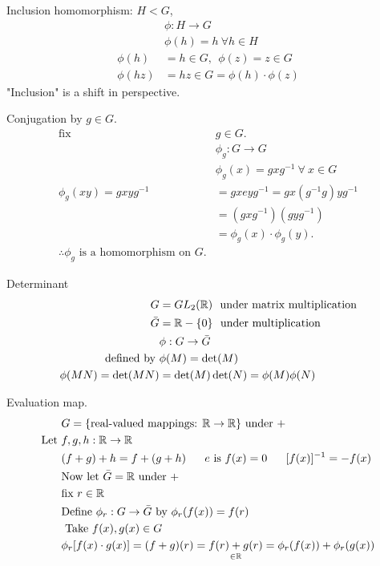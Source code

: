 \begin{example}
Inclusion homomorphism: $H<G$,
\begin{align}
    &\phi : H\rightarrow G \nonumber \\
    &\phi(h)= h \nonumber \ \forall h \in H \\
    \phi(h)&=h\in G, \ \ \phi(z)=z\in G \nonumber \\
    \phi(hz)&=hz\in G = \phi(h)\cdot \phi(z) \nonumber
\end{align}
"Inclusion" is a shift in perspective.
\end{example}

\begin{example}
Conjugation by $g\in G$.
\begin{align}
    \text{fix } &g \in G. \nonumber \\
    &\phi_g: G\rightarrow G \nonumber \\
    &\phi_g(x)=gxg^{-1} \ \forall \ x \in G \nonumber \\
    \phi_g(xy)=gxyg^{-1}&=gxeyg^{-1}=gx(g^{-1}g)yg^{-1} \nonumber \\
    &=(gxg^{-1})(gyg^{-1}) \nonumber \\
    &=\phi_g(x)\cdot \phi_g(y). \nonumber \\
    \therefore \phi_g \text{ is a homomorphism on }G. \nonumber
\end{align}
\end{example}

\begin{example}
Determinant
\begin{align}
    G&=GL_2({\mathbb{R}}) \ \text{ under matrix multiplication} \nonumber \\
    \bar{G}&={\mathbb{R}}-\{0\} \ \text{ under multiplication } \nonumber \\
    &\phi:G\rightarrow \bar{G} \nonumber\\
    \text{ defined by } &\phi(M)=\det(M) \nonumber\\
    \phi(MN)=\det(MN)&=\det(M)\det(N)=\phi(M)\phi(N) \nonumber
\end{align}
\end{example}

\begin{example}
Evaluation map.
\begin{align}
    &G= \{\text{real-valued mappings: } \R \rightarrow \R \} \text{ under }+ \nonumber \\
    \text{Let }&f,g,h:\R \rightarrow \R \nonumber \\
    &(f+g)+h=f+(g+h) \ \ \ \ \ e\text{ is }f(x)=0 \ \ \ \ \ [f(x)]^{-1}=-f(x) \nonumber \\
    &\text{Now let } \bar{G} = \R \text{ under }+ \nonumber \\
    &\text{fix }r\in \R \nonumber \\
    &\text{Define } \phi_r:G\rightarrow \bar{G} \text{ by } \phi_r(f(x))=f(r) \nonumber \\
    &\text{ Take } f(x),g(x)\in G \nonumber \\
    &\phi_r[f(x)\cdot g(x)]=(f+g)(r)=\underset{\in \R}{f(r)+g(r)} = \phi_r(f(x))+\phi_r(g(x)) \nonumber
\end{align}
\end{example}

